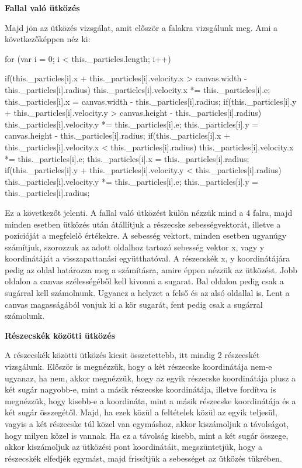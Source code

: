 \textbf{Fallal való ütközés}

Majd jön az ütközés vizsgálat, amit először a falakra vizsgálunk meg. Ami a következőképpen néz ki:
\begin{java}
for (var i = 0; i < this._particles.length; i++) 
  {
   if(this._particles[i].x + this._particles[i].velocity.x >
    canvas.width - this._particles[i].radius)
   {
    this._particles[i].velocity.x *= this._particles[i].e;
    this._particles[i].x = canvas.width -
     this._particles[i].radius;
   }
    if(this._particles[i].y + this._particles[i].velocity.y >
     canvas.height - this._particles[i].radius)
   {
    this._particles[i].velocity.y *= this._particles[i].e;
    this._particles[i].y = canvas.height -
     this._particles[i].radius;
   }
    if(this._particles[i].x + this._particles[i].velocity.x <
     this._particles[i].radius)
   {
    this._particles[i].velocity.x *= this._particles[i].e;
    this._particles[i].x = this._particles[i].radius;
   }
    if(this._particles[i].y + this._particles[i].velocity.y <
     this._particles[i].radius)
   {
    this._particles[i].velocity.y *= this._particles[i].e;
    this._particles[i].y = this._particles[i].radius;
   }
		
  }
\end{java}
Ez a következőt jelenti. A fallal való ütközést külön nézzük mind a 4 falra, majd minden esetben ütközés után átállítjuk a részecske sebességvektorát, illetve a pozícióját a megfelelő értékekre. A sebesség vektort, minden esetben ugyanúgy számítjuk, szorozzuk az adott oldalhoz tartozó sebesség vektor x, vagy y koordinátáját a visszapattanási együtthatóval. A részecskék x, y koordinátájára pedig az oldal határozza meg a számításra, amire éppen nézzük az ütközést. Jobb oldalon a canvas szélességéből kell kivonni a sugarat. Bal oldalon pedig csak a sugárral kell számolnunk. Ugyanez a helyzet a felső és az alsó oldallal is. Lent a canvas magasságából vonjuk ki a kör sugarát, fent pedig csak a sugárral számolunk.

\textbf{Részecskék közötti ütközés}

A részecskék  közötti ütközés kicsit összetettebb, itt mindig 2 részecskét vizsgálunk. Először is megnézzük, hogy a két részecske koordinátája nem-e ugyanaz, ha nem, akkor megnézzük, hogy az egyik részecske koordinátája plusz a két sugár nagyobb-e, mint a másik részecske koordinátája, illetve fordítva is megnézzük, hogy kisebb-e a koordináta, mint a másik részecske koordinátája és a két sugár összegétől. Majd, ha ezek közül a feltételek közül az egyik teljesül, vagyis a két részecske túl közel van egymáshoz, akkor kiszámoljuk a távolságot, hogy milyen közel is vannak. Ha ez a távolság kisebb, mint a két sugár összege, akkor kiszámoljuk az ütközési pont koordinátáit, megszüntetjük, hogy a részecskék elfedjék egymást, majd frissítjük a sebességet az ütközés tükrében.

